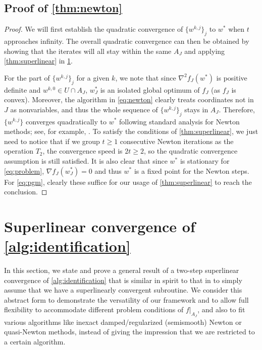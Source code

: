\documentclass{article}
\theoremstyle{plain}
\theoremstyle{definition}
\theoremstyle{remark}
\newcommand{\norm}[1]{{\left\|{#1}\right\|}}
\begin{document}
\subsection{Proof of \cref{thm:newton}}
\begin{proof}
We will first establish the quadratic convergence of
$\{w^{k,j}\}_j$ to $w^*$ when $t$ approaches infinity.
The overall quadratic convergence can then be obtained by showing that
the iterates will all stay within the same $A_J$ and applying
\cref{thm:superlinear} in \cref{sec:superlinear}.

For the part of $\{w^{k,j}\}_j$ for a given $k$,
we note that since $\nabla^2 f_{J}(w^*)$ is positive definite and
$w^{k,0} \in U \cap A_J$,
$w^*_J$ is an isolated global optimum of $f_J$ (as $f_J$ is convex).
Moreover, the algorithm in \cref{eq:newton} clearly treats coordinates not in
$J$ as nonvariables, and thus the whole sequence of $\{w^{k,j}\}_j$
stays in $A_J$.
Therefore, $\{w^{k,j}\}$ converges quadratically to $w^*$ following
standard analysis for Newton methods; see, for example,
\citep[Chapter~3]{NoceWrig06}.
To satisfy the conditions of \cref{thm:superlinear}, we just need to
notice that if we group $t \geq 1$ consecutive Newton iterations as
the operation $T_2$,
the convergence speed is $2t \geq 2$, so the quadratic convergence
assumption is still satisfied.
It is also clear that since $w^*$ is stationary for
\cref{eq:problem},
$\nabla f_J(w^*_J) = 0$ and thus $w^*$ is a fixed point for the
Newton steps.
For \cref{eq:pgm}, clearly these suffice for our usage of
\cref{thm:superlinear} to reach the conclusion.
%
\end{proof}



\section{Superlinear convergence of \cref{alg:identification}}
\label{sec:superlinear}
In this section, we state and prove a general result of a two-step superlinear
convergence of \cref{alg:identification} that is similar in spirit
to that in \cite{BarIM20a} to simply assume that we have a
superlinearly convergent subroutine.
We consider this abstract form to demonstrate the versatility of our
framework and to allow full flexibility to
accommodate different problem conditions of $f|_{A_J}$, and also to fit
various algorithms like inexact damped/regularized (semismooth) Newton or
quasi-Newton methods, instead of giving the impression that we are restricted
to a certain algorithm.
\end{document}
